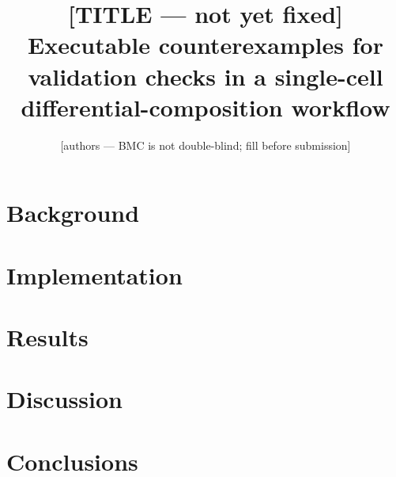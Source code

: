\documentclass[11pt]{article}
\title{\textbf{[TITLE — not yet fixed]}\\
\large Executable counterexamples for validation checks in a single-cell
differential-composition workflow}
\author{[authors — BMC is not double-blind; fill before submission]}
\date{}
\begin{document}
\maketitle



\section{Background}


\section{Implementation}


\section{Results}


\section{Discussion}


\section{Conclusions}






\end{document}
